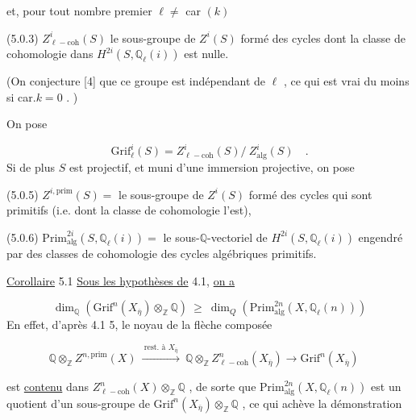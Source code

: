 et, pour tout nombre premier  $\ell \neq$ car $(k)$

(5.0.3)   $Z^i_{\ell-\mathrm{coh}}(S)$  le sous-groupe de  $Z^i(S)$  formé des cycles dont la classe de cohomologie dans  $H^{2i}(S,\mathbb{Q}_\ell(i))$  est nulle.

(On conjecture [4] que ce groupe est indépendant de  $\ell$  , ce qui est vrai du moins si  car.$k=0$ . )

On pose

\begin{equation}\tag{5.0.4}
\mathrm{Grif}^i_\ell(S) = Z^i_{\ell-\mathrm{coh}}(S)/\ Z^i_{\mathrm{alg}}(S) \quad .
\end{equation}
Si de plus  $S$  est projectif, et muni d'une immersion projective, on pose

(5.0.5)   $Z^{i,\mathrm{prim}}(S) =$ le sous-groupe de  $Z^i(S)$  formé des cycles qui sont primitifs (i.e. dont la classe de cohomologie l'est),

(5.0.6)   $\mathrm{Prim}^{2i}_{\mathrm{alg}}(S,\mathbb{Q}_\ell(i)) =$ le sous-$\mathbb{Q}$-vectoriel de  $H^{2i}(S,\mathbb{Q}_\ell(i))$ engendré par des classes de cohomologie des cycles algébriques primitifs.

\underline{Corollaire} 5.1    \underline{Sous les hypothèses de}  4.1, \underline{on a}

\begin{equation}\tag*{5.1.1,}
\dim_{\mathbb{Q}}(\mathrm{Grif}^n(X_{\overline{\eta}})\otimes_{\mathbb{Z}}\mathbb{Q}) \ \geq \ \dim_Q(\mathrm{Prim}^{2n}_{\mathrm{alg}}(X,\mathbb{Q}_\ell(n)))
\end{equation}
En effet, d'après 4.1 5, le noyau de la flèche composée

\begin{equation*}
\mathbb{Q}\otimes_{\mathbb{Z}}Z^{n,\mathrm{prim}}(X) \ \xrightarrow{\ \text{rest. à } X_{\overline{\eta}}\ }\ \mathbb{Q} \otimes_{\mathbb{Z}}Z^n_{\ell-\mathrm{coh}}(X_{\overline{\eta}}) \longrightarrow \mathrm{Grif}^n(X_{\overline{\eta}}) \quad 
\end{equation*}


 est \underline{contenu} dans $Z^n_{\ell-\mathrm{coh}}(X) \otimes_{\mathbb{Z}} \mathbb{Q}$ , de sorte que $\mathrm{Prim}^{2n}_{\mathrm{alg}}(X,\mathbb{Q}_{\ell}(n))$ est un quotient d'un sous-groupe de $\mathrm{Grif}^n(X_{\overline{\eta}}) \otimes_{\mathbb{Z}} \mathbb{Q}$ , ce qui achève la démonstration

